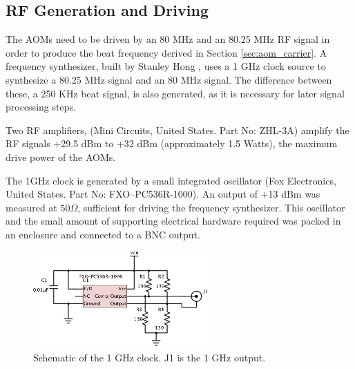 
\subsection{RF Generation and Driving}

The AOMs need to be driven by an 80 MHz and an 80.25 MHz RF signal in order to produce the beat frequency derived in Section \ref{sec:aom_carrier}. A frequency synthesizer, built by Stanley Hong \cite{hong}, uses a 1 GHz clock source to synthesize a 80.25 MHz signal and an 80 MHz signal. The difference between these, a 250 KHz beat signal, is also generated, as it is necessary for later signal processing steps.

Two RF amplifiers, (Mini Circuits, United States. Part No: ZHL-3A) amplify the RF signals +29.5 dBm to +32 dBm (approximately 1.5 Watts), the maximum drive power of the AOMs.

The 1GHz clock is generated by a small integrated oscillator (Fox Electronics, United States. Part No: FXO–PC536R-1000). An output of +13 dBm was measured at $50\Omega$, sufficient for driving the frequency synthesizer. This oscillator and the small amount of supporting electrical hardware required was packed in an enclosure and connected to a BNC output.

\begin{figure}[h!]
\centering
\includegraphics[width=0.6\textwidth]{Images/Schematics/1ghzclock_2.png}
\caption[Schematic of the 1Ghz clock.]{Schematic of the 1 GHz clock. J1 is the 1 GHz output.}
\end{figure}


